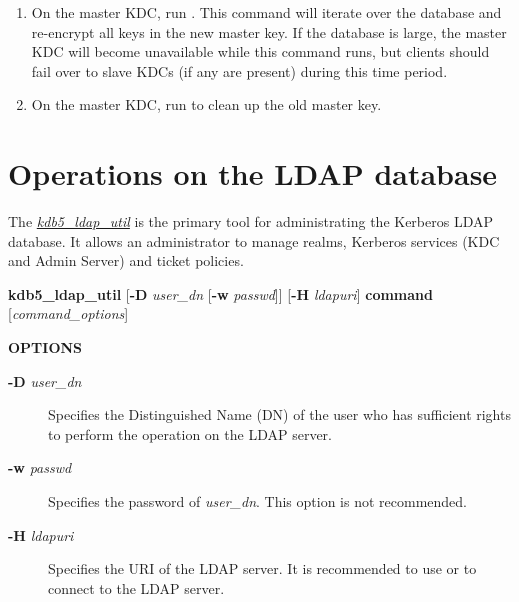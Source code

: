 \documentclass[letterpaper,10pt,english]{sphinxmanual}
\begin{document}
\begin{enumerate}
\item {} 
On the master KDC, run .  This
command will iterate over the database and re-encrypt all keys in
the new master key.  If the database is large, the master KDC will
become unavailable while this command runs, but clients should fail
over to slave KDCs (if any are present) during this time period.

\item {} 
On the master KDC, run  to clean up the
old master key.

\end{enumerate}


\section{Operations on the LDAP database}
\label{admin/database:operations-on-the-ldap-database}\label{admin/database:ops-on-ldap}
The {\hyperref[admin/admin_commands/kdb5_ldap_util:kdb5-ldap-util-8]{\emph{kdb5\_ldap\_util}}} is the primary tool for administrating
the Kerberos LDAP database.  It allows an administrator to manage
realms, Kerberos services (KDC and Admin Server) and ticket policies.

\textbf{kdb5\_ldap\_util}
{[}\textbf{-D} \emph{user\_dn} {[}\textbf{-w} \emph{passwd}{]}{]}
{[}\textbf{-H} \emph{ldapuri}{]}
\textbf{command}
{[}\emph{command\_options}{]}

\textbf{OPTIONS}
\begin{description}
\item[{\textbf{-D} \emph{user\_dn}}] \leavevmode
Specifies the Distinguished Name (DN) of the user who has
sufficient rights to perform the operation on the LDAP server.

\item[{\textbf{-w} \emph{passwd}}] \leavevmode
Specifies the password of \emph{user\_dn}.  This option is not
recommended.

\item[{\textbf{-H} \emph{ldapuri}}] \leavevmode
Specifies the URI of the LDAP server.  It is recommended to use
 or  to connect to the LDAP server.

\end{description}
\end{document}
